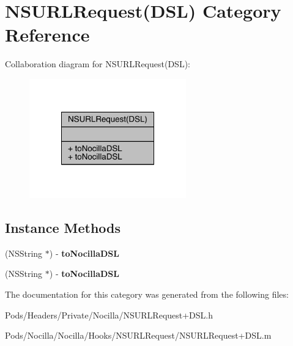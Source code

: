 \hypertarget{category_n_s_u_r_l_request_07_d_s_l_08}{\section{N\-S\-U\-R\-L\-Request(D\-S\-L) Category Reference}
\label{category_n_s_u_r_l_request_07_d_s_l_08}
}


Collaboration diagram for N\-S\-U\-R\-L\-Request(D\-S\-L)\-:\nopagebreak
\begin{figure}[H]
\begin{center}
\leavevmode
\includegraphics[width=192pt]{category_n_s_u_r_l_request_07_d_s_l_08__coll__graph}
\end{center}
\end{figure}
\subsection*{Instance Methods}
\begin{DoxyCompactItemize}
\item 
\hypertarget{category_n_s_u_r_l_request_07_d_s_l_08_a109bc71da4f636bed10868b3b9a15807}{(N\-S\-String $\ast$) -\/ {\bfseries to\-Nocilla\-D\-S\-L}}\label{category_n_s_u_r_l_request_07_d_s_l_08_a109bc71da4f636bed10868b3b9a15807}

\item 
\hypertarget{category_n_s_u_r_l_request_07_d_s_l_08_a109bc71da4f636bed10868b3b9a15807}{(N\-S\-String $\ast$) -\/ {\bfseries to\-Nocilla\-D\-S\-L}}\label{category_n_s_u_r_l_request_07_d_s_l_08_a109bc71da4f636bed10868b3b9a15807}

\end{DoxyCompactItemize}


The documentation for this category was generated from the following files\-:\begin{DoxyCompactItemize}
\item 
Pods/\-Headers/\-Private/\-Nocilla/N\-S\-U\-R\-L\-Request+\-D\-S\-L.\-h\item 
Pods/\-Nocilla/\-Nocilla/\-Hooks/\-N\-S\-U\-R\-L\-Request/N\-S\-U\-R\-L\-Request+\-D\-S\-L.\-m\end{DoxyCompactItemize}
